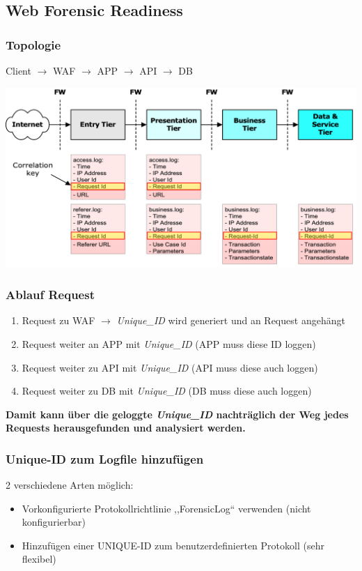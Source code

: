 \subsection{Web Forensic Readiness}

\subsubsection{Topologie}
Client $\rightarrow$ WAF $\rightarrow$ APP $\rightarrow$ API $\rightarrow$ DB
\begin{center}
    \includegraphics[width=1.0\linewidth]{./img/08-forensic_readiness/web_fr}
    \vspace{-8pt}
\end{center}

\subsubsection{Ablauf Request}
\begin{enumerate}
    \item Request zu WAF $\rightarrow$ \textit{Unique\_ID} wird generiert und an Request \glqq angehängt\grqq
    \item Request weiter an APP mit \textit{Unique\_ID} (APP muss diese ID loggen)
    \item Request weiter zu API mit \textit{Unique\_ID} (API muss diese auch loggen)
    \item Request weiter zu DB mit \textit{Unique\_ID} (DB muss diese auch loggen)\\
\end{enumerate}
\vspace{-8pt}
\textbf{Damit kann über die geloggte \textit{Unique\_ID} nachträglich der Weg jedes Requests herausgefunden und analysiert werden.}

\subsubsection{Unique-ID zum Logfile hinzufügen}
2 verschiedene Arten möglich:
\begin{itemize}
    \item Vorkonfigurierte Protokollrichtlinie ,,ForensicLog`` verwenden (nicht konfigurierbar)
    \item Hinzufügen einer UNIQUE-ID zum benutzerdefinierten Protokoll (sehr flexibel)
\end{itemize}
